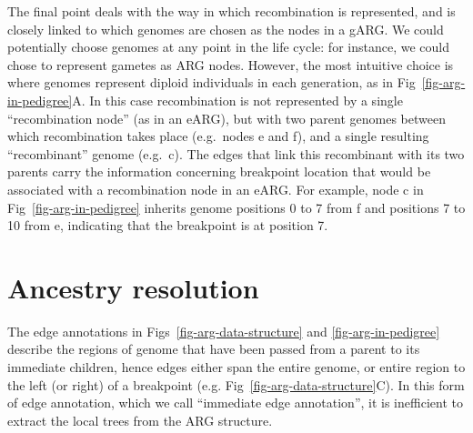 \documentclass{article}
\begin{document}
The final point deals with the way in which recombination is represented, and is
closely linked to which genomes are chosen as the nodes in a gARG.
We could potentially choose genomes at any point in the life cycle: for instance,
we could chose to represent gametes as ARG nodes. However, the most intuitive
choice is where genomes represent diploid individuals in each generation, as in
Fig~\ref{fig-arg-in-pedigree}A. In this case recombination
is not represented by a single ``recombination node'' (as in an eARG), but with
two parent genomes between which recombination takes place
(e.g.\ nodes \textsf{e} and \textsf{f}), and a
single resulting ``recombinant'' genome (e.g.\ \textsf{c}). The
edges that link this recombinant with its two parents carry the information
concerning breakpoint location that would be associated with a
recombination node in an eARG. For example, node \textsf{c} in
Fig~\ref{fig-arg-in-pedigree} inherits genome positions 0 to 7 from \textsf{f}
and positions 7 to 10 from \textsf{e}, indicating that the breakpoint is at position 7.




\section*{Ancestry resolution}\label{Ancestry_resolution}

The edge annotations in Figs~\ref{fig-arg-data-structure} and \ref{fig-arg-in-pedigree}
describe the regions of genome that have been passed from a parent to its immediate children,
hence edges either span the entire genome, or entire region to the left (or right)
of a breakpoint
(e.g. Fig~\ref{fig-arg-data-structure}C). In this form of edge annotation, which we call
``immediate edge annotation'',  %
it is inefficient to extract the local trees from the ARG structure.
\end{document}
